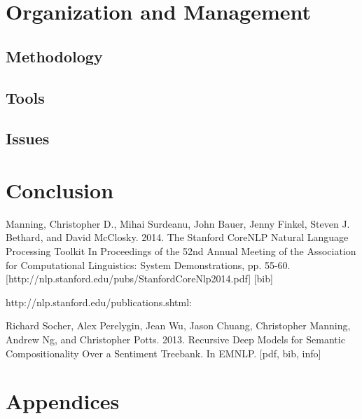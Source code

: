 \documentclass[11pt]{article}
\begin{document}
\section{Organization and Management}

\subsection{Methodology}
\subsection{Tools}
\subsection{Issues}

\section{Conclusion}







Manning, Christopher D., Mihai Surdeanu, John Bauer, Jenny Finkel, Steven J. Bethard, and David McClosky. 2014. The Stanford CoreNLP Natural Language Processing Toolkit In Proceedings of the 52nd Annual Meeting of the Association for Computational Linguistics: System Demonstrations, pp. 55-60. [http://nlp.stanford.edu/pubs/StanfordCoreNlp2014.pdf] [bib]

http://nlp.stanford.edu/publications.shtml:

Richard Socher, Alex Perelygin, Jean Wu, Jason Chuang, Christopher Manning, Andrew Ng, and Christopher Potts. 2013. Recursive Deep Models for Semantic Compositionality Over a Sentiment Treebank. In EMNLP. [pdf, bib, info]

\section{Appendices}
\end{document}
